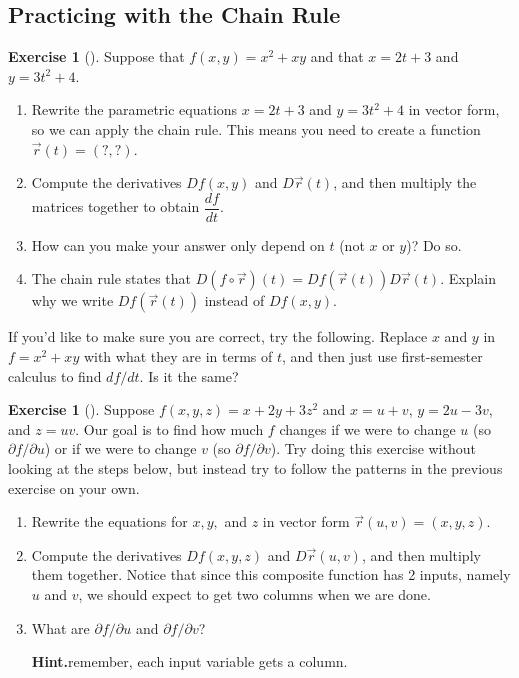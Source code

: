 \documentclass[10pt,]{book}
\theoremstyle{plain}
\theoremstyle{definition}
\theoremstyle{definition}
\theoremstyle{definition}
\theoremstyle{definition}
\newtheorem{exploration}[project]{Exercise}
\theoremstyle{definition}
\numberwithin{equation}{section}
\begin{document}
\subsection[{Practicing with the Chain Rule}]{Practicing with the Chain Rule}\label{subsection-38}
\begin{exploration}[]\label{exploration-152}
Suppose that \(f(x,y) = x^2+xy\) and that \(x=2t+3\) and \(y=3t^2+4\).%
\begin{enumerate}[font=\bfseries,label=(\alph*),ref=\alph*]
\item\label{task-357} Rewrite the parametric equations \(x=2t+3\) and \(y=3t^2+4\) in vector form, so we can apply the chain rule. This means you need to create a function \(\vec r(t) = (?, ?)\).%
\item\label{task-358} Compute the derivatives \(Df(x,y)\) and \(D\vec r(t)\), and then multiply the matrices together to obtain \(\dfrac{df}{dt}\).%
\item\label{task-359} How can you make your answer only depend on \(t\) (not \(x\) or \(y\))? Do so.%
\item\label{task-360} The chain rule states that \(D(f\circ \vec r)(t) = Df(\vec r(t))D\vec r(t)\). Explain why we write \(Df(\vec r(t))\) instead of \(Df(x,y)\).%
\end{enumerate}
\bigbreak
If you'd like to make sure you are correct, try the following. Replace \(x\) and \(y\) in \(f=x^2+xy\) with what they are in terms of \(t\), and then just use first-semester calculus to find \(df/dt\). Is it the same?%
\end{exploration}
\begin{exploration}[]\label{exploration-153}
Suppose \(f(x,y,z) = x+2y+3z^2\) and \(x=u+v\), \(y=2u-3v\), and \(z=uv\). Our goal is to find how much \(f\) changes if we were to change \(u\) (so \(\partial f/\partial u\)) or if we were to change \(v\) (so \(\partial f/\partial v\)). Try doing this exercise without looking at the steps below, but instead try to follow the patterns in the previous exercise on your own.%
\begin{enumerate}[font=\bfseries,label=(\alph*),ref=\alph*]
\item\label{task-361} Rewrite the equations for \(x,y,\) and \(z\) in vector form \(\vec r(u,v)=(x,y,z)\).%
\item\label{task-362} Compute the derivatives \(Df(x,y,z)\) and \(D\vec r(u,v)\), and then multiply them together. Notice that since this composite function has 2 inputs, namely \(u\) and \(v\), we should expect to get two columns when we are done.%
\item\label{task-363} What are \(\partial f/\partial u\) and \(\partial f/\partial v\)?%
\par\medskip\noindent%
\textbf{Hint.}\quad remember, each input variable gets a column.%
\end{enumerate}
\end{exploration}
\end{document}
